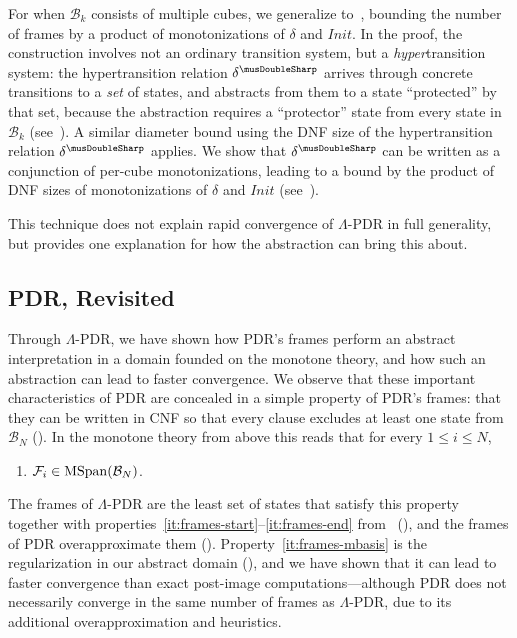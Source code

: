 \documentclass[acmsmall,screen]{acmart}
\newcommand{\Init}{{\textit{Init}}}
\newcommand{\tr}{\delta}
\newcommand{\Frame}{\mathcal{F}}
\newcommand{\bkwrch}[1]{\mathcal{B}_{#1}}
\newcommand{\mspan}[1]{{\rm MSpan}({#1})}
\newcommand{\absr}[1]{{#1}^{\musDoubleSharp}}
\begin{document}
For when $\bkwrch{k}$ consists of multiple cubes, we generalize  to~, bounding the number of frames by a product of monotonizations of $\tr$ and $\Init$. In the proof, the construction involves not an ordinary transition system, but a \emph{hyper}transition system: the hypertransition relation $\absr{\tr}$ arrives through concrete transitions to a \emph{set} of states, and abstracts from them to a state ``protected'' by that set, because the abstraction requires a ``protector'' state from every state in $\bkwrch{k}$ (see~).
A similar diameter bound using the DNF size of the hypertransition relation $\absr{\tr}$ applies.
%
We show that $\absr{\tr}$ can be written as a conjunction of per-cube monotonizations, leading to a bound by the product of DNF sizes of monotonizations of $\tr$ and $\Init$ (see~).
%
%
%
%

This technique does not explain rapid convergence of $\Lambda$-PDR in full generality, but provides one explanation for how the abstraction can bring this about.
%

\subsection{PDR, Revisited}
Through $\Lambda$-PDR, we have shown how PDR's frames perform an abstract interpretation in a domain founded on the monotone theory, and how such an abstraction can lead to faster convergence. We observe that these important characteristics of PDR are concealed in a simple property of PDR's frames: that they can be written in CNF so that every clause excludes at least one state from $\bkwrch{N}$ ().
%
%
%
%
%
In the monotone theory from above this reads that for every $1 \leq i \leq N$,
\iflong
\else
\vspace{-0.2cm}
\fi
\begin{tcolorbox}[boxsep=0pt]
		\begin{enumerate}
			\setcounter{enumi}{\value{overview-frame-props}}
			\item \label{it:frames-mbasis} $\Frame_i \in \mspan{\bkwrch{N}}$.
		\end{enumerate}
\end{tcolorbox}
\iflong
\else
\vspace{-0.2cm}
\fi
\noindent
The frames of $\Lambda$-PDR are the least set of states that satisfy this property together with properties~\ref{it:frames-start}--\ref{it:frames-end} from~ (), and the frames of PDR overapproximate them ().
Property~\ref{it:frames-mbasis} is the regularization in our abstract domain (), and we have shown that it can lead to faster convergence than exact post-image computations---although PDR does not necessarily converge in the same number of frames as $\Lambda$-PDR, due to its additional overapproximation and heuristics.
%
%
%
\end{document}
